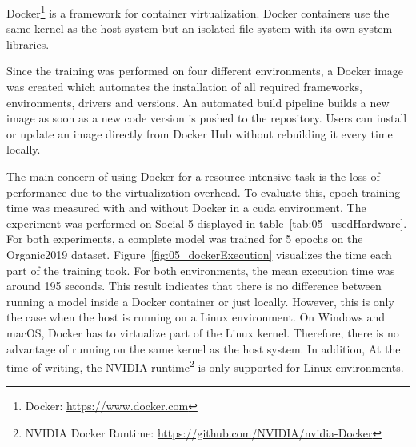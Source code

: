 Docker\footnote{Docker: \url{https://www.docker.com}} is a framework for container virtualization. Docker containers use the same kernel as the host system but an isolated file system with its own system libraries. 
\medskip

Since the training was performed on four different environments, a Docker image was created which automates the installation of all required frameworks, environments, drivers and versions. An automated build pipeline builds a new image as soon as a new code version is pushed to the repository. Users can install or update an image directly from Docker Hub without rebuilding it every time locally.
\medskip

The main concern of using Docker for a resource-intensive task is the loss of performance due to the virtualization overhead. To evaluate this, epoch training time was measured with and without Docker in a \gls{cuda} environment. The experiment was performed on Social 5 displayed in table~\ref{tab:05_usedHardware}. For both experiments, a complete model was trained for 5 epochs on the Organic2019 dataset. Figure~\ref{fig:05_dockerExecution} visualizes the time each part of the training took. For both environments, the mean execution time was around 195 seconds. This result indicates that there is no difference between running a model inside a Docker container or just locally. However, this is only the case when the host is running on a Linux environment. On Windows and macOS, Docker has to virtualize part of the Linux kernel. Therefore, there is no advantage of running on the same kernel as the host system. In addition, At the time of writing, the NVIDIA-runtime\footnote{NVIDIA Docker Runtime: \url{https://github.com/NVIDIA/nvidia-Docker}} is only supported for Linux environments.
